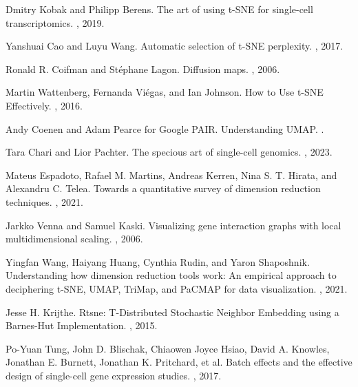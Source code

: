\documentclass{article}
\begin{document}
\begin{thebibliography}{10}
Dmitry Kobak and Philipp Berens.
\newblock The art of using t-SNE for single-cell transcriptomics.
, 2019.

Yanshuai Cao and Luyu Wang. 
\newblock Automatic selection of t-SNE perplexity.
, 2017.

Ronald R. Coifman and St\'ephane Lagon.
\newblock Diffusion maps.
, 2006.

Martin Wattenberg, Fernanda Vi\'egas, and Ian Johnson.
\newblock How to Use t-SNE Effectively.
, 2016.

Andy Coenen and Adam Pearce for Google PAIR.
\newblock Understanding UMAP.
.

Tara Chari and Lior Pachter.
\newblock The specious art of single-cell genomics.
,  2023.

Mateus Espadoto, Rafael M. Martins, Andreas Kerren, Nina S. T. Hirata, and Alexandru C. Telea.
\newblock Towards a quantitative survey of dimension reduction techniques.
, 2021.

Jarkko Venna and Samuel Kaski.
\newblock Visualizing gene interaction graphs with local multidimensional scaling.
, 2006.

Yingfan Wang, Haiyang Huang, Cynthia Rudin, and Yaron Shaposhnik.
\newblock Understanding how dimension reduction tools work: An empirical approach to deciphering t-SNE, UMAP, TriMap, and PaCMAP for data visualization.
, 2021.

Jesse H. Krijthe.
\newblock Rtsne: T-Distributed Stochastic Neighbor Embedding using a Barnes-Hut Implementation.
, 2015.

 Po-Yuan Tung, John D. Blischak, Chiaowen Joyce Hsiao, David A. Knowles, Jonathan E. Burnett, Jonathan K. Pritchard, et al.
 \newblock Batch effects and the effective design of single-cell gene expression studies.
 , 2017.


\end{thebibliography}
\end{document}
